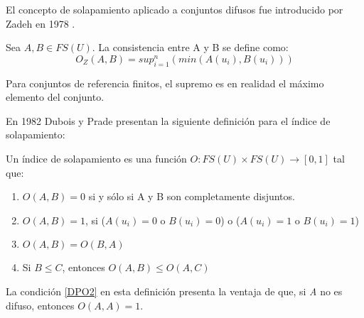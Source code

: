 El concepto de solapamiento aplicado a conjuntos difusos fue introducido por Zadeh en 1978 \cite{zadeh1978}.

\begin{definition}
Sea $A,B \in FS(U)$. La consistencia entre A y B se define como:
\begin{equation}\label{eq:zadeh-consistency}
O_{Z}(A,B) = sup_{i=1}^{n}(min(A(u_{i}),B(u_{i})))
\end{equation}
\end{definition}

Para conjuntos de referencia finitos, el supremo es en realidad el máximo elemento del conjunto.

En 1982 Dubois y Prade \cite{dubois2000} presentan la siguiente definición para el índice de solapamiento:

\begin{definition}
Un índice de solapamiento es una función $O : FS(U) \times FS(U) \rightarrow [0,1]$ tal que:
\begin{enumerate}[label=(O\arabic*),ref=(O\arabic*)]
\item $O(A,B) = 0$ si y sólo si A y B son completamente disjuntos. \label{DP01}
\item $O(A,B) = 1$, si ($A(u_{i}) = 0$ o $B(u_{i}) = 0$) o ($A(u_{i}) = 1$ o $B(u_{i}) = 1$) \label{DPO2}
\item $O(A,B) = O(B,A)$ \label{DPO3}
\item Si $B \leq C$, entonces $O(A,B) \leq O(A,C)$ \label{DPO4}
\end{enumerate}
\end{definition} \label{def:dubois-overlap-index}
La condición \ref{DPO2} en esta definición presenta la ventaja de que, si \emph{A} no es difuso, entonces $O(A,A) = 1$.

